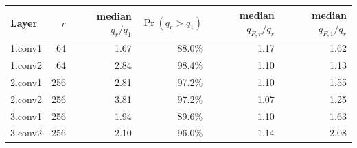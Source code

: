 \begin{tabular}{lrrrrr}
\toprule
Layer & $r$ & median $q_r/q_1$ & $\Pr(q_r>q_1)$ & median $q_{F,r}/q_r$ & median $q_{F,1}/q_r$ \\
\midrule
1.conv1 & 64 & 1.67 & 88.0\% & 1.17 & 1.62 \\
1.conv2 & 64 & 2.84 & 98.4\% & 1.10 & 1.13 \\
2.conv1 & 256 & 2.81 & 97.2\% & 1.10 & 1.55 \\
2.conv2 & 256 & 3.81 & 97.2\% & 1.07 & 1.25 \\
3.conv1 & 256 & 1.94 & 89.6\% & 1.10 & 1.63 \\
3.conv2 & 256 & 2.10 & 96.0\% & 1.14 & 2.08 \\
\bottomrule
\end{tabular}
